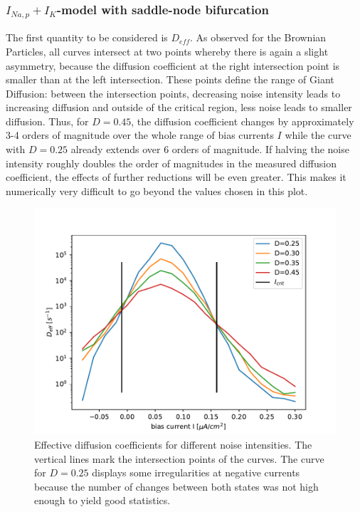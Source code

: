 \documentclass[12pt,a4paper]{article}
\begin{document}
\subsubsection{$I_{Na,p}+I_K$-model with saddle-node bifurcation}
The first quantity to be considered is $D_{eff}$.
As observed for the Brownian Particles, all curves intersect at two points whereby there is again a slight asymmetry, because the diffusion coefficient at the right intersection point is smaller than at the left intersection. These points define the range of Giant Diffusion: between the intersection points, decreasing noise intensity leads to increasing diffusion and outside of the critical region, less noise leads to smaller diffusion. Thus, for $D=0.45$, the diffusion coefficient changes by approximately 3-4 orders of magnitude over the whole range of bias currents $I$ while the curve with $D=0.25$ already extends over 6 orders of magnitude. If halving the noise intensity roughly doubles the order of magnitudes in the measured diffusion coefficient, the effects of further reductions will be even greater. This makes it numerically very difficult to go beyond the values chosen in this plot.
\begin{figure}[H]
	\centering
	\includegraphics[scale=1]{dneur23critrealfast16alcoarsewstfrealfast9acoarsetf.pdf}\caption{Effective diffusion coefficients for different noise intensities. The vertical lines mark the intersection points of the curves. The curve for $D=0.25$ displays some irregularities at negative currents because the number of changes between both states was not high enough to yield good statistics.}
	\label{deff}
\end{figure}
\end{document}
